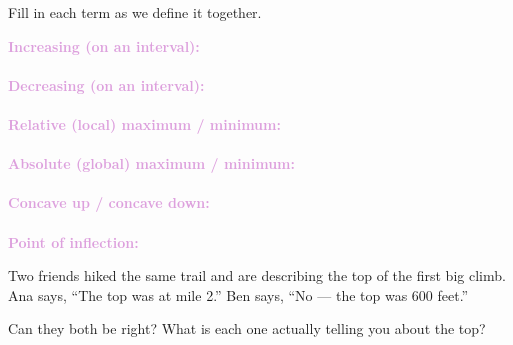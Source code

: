 \documentclass[10pt]{article}
\begin{document}

\vspace{0.12in}

\boxguard
\begin{vocabbox}
Fill in each term as we define it together.
\par\vspace{2pt}
\noindent\textbf{\textcolor{plum}{Increasing (on an interval):}}\\[1pt]
\writeline\\[3pt]
\noindent\textbf{\textcolor{plum}{Decreasing (on an interval):}}\\[1pt]
\writeline\\[3pt]
\noindent\textbf{\textcolor{plum}{Relative (local) maximum / minimum:}}\\[1pt]
\writeline\\[3pt]
\noindent\textbf{\textcolor{plum}{Absolute (global) maximum / minimum:}}\\[1pt]
\writeline\\[3pt]
\noindent\textbf{\textcolor{plum}{Concave up / concave down:}}\\[1pt]
\writeline\\[3pt]
\noindent\textbf{\textcolor{plum}{Point of inflection:}}\\[1pt]
\writeline
\end{vocabbox}

\vspace{0.1in}

\boxguard
\begin{hookbox}
Two friends hiked the same trail and are describing the top of the first big climb. Ana says,
``The top was at mile 2.'' Ben says, ``No --- the top was 600 feet.''

Can they both be right? What is each one actually telling you about the top?
\end{hookbox}
\end{document}
